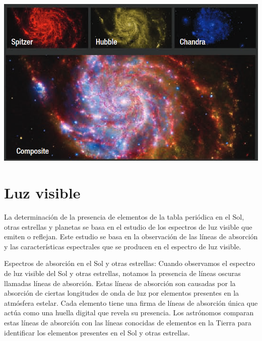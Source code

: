 \documentclass[a4paper,12pt]{article}
\newenvironment{Figure}
  {\par\medskip\noindent\minipage{\linewidth}}
  {\endminipage\par\medskip}
\begin{document}
\begin{multicols*}{2}
\begin{Figure}
    \centering
    \includegraphics[width=1\linewidth]{satViewComposite.png}
    \label{fig: satViewComposite}
\end{Figure}

\section*{Luz visible}

La determinación de la presencia de elementos de la tabla periódica en el Sol, otras estrellas y planetas se basa en el estudio de los espectros de luz visible que emiten o reflejan. Este estudio se basa en la observación de las líneas de absorción y las características espectrales que se producen en el espectro de luz visible.

Espectros de absorción en el Sol y otras estrellas: Cuando observamos el espectro de luz visible del Sol y otras estrellas, notamos la presencia de líneas oscuras llamadas líneas de absorción. Estas líneas de absorción son causadas por la absorción de ciertas longitudes de onda de luz por elementos presentes en la atmósfera estelar. Cada elemento tiene una firma de líneas de absorción única que actúa como una huella digital que revela su presencia. Los astrónomos comparan estas líneas de absorción con las líneas conocidas de elementos en la Tierra para identificar los elementos presentes en el Sol y otras estrellas.


\end{multicols*}
\end{document}
